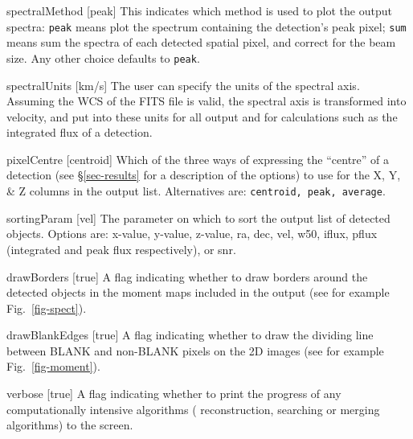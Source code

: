 \begin{Lentry}
\item[{spectralMethod [peak]}] This indicates which method is used
  to plot the output spectra: \texttt{peak} means plot the spectrum
  containing the detection's peak pixel; \texttt{sum} means sum the
  spectra of each detected spatial pixel, and correct for the beam
  size. Any other choice defaults to \texttt{peak}.
\item[{spectralUnits [km/s]}] The user can specify the units of
  the spectral axis. Assuming the WCS of the FITS file is valid, the
  spectral axis is transformed into velocity, and put into these units
  for all output and for calculations such as the integrated flux of a
  detection.
\item[{pixelCentre [centroid]}] Which of the three ways of
  expressing the ``centre'' of a detection (see \S\ref{sec-results}
  for a description of the options) to use for the X, Y, \& Z
  columns in the output list. Alternatives are: \texttt{centroid, peak,
  average}.
\item[{sortingParam [vel]}] The parameter on which to sort the output
  list of detected objects. Options are: x-value, y-value, z-value,
  ra, dec, vel, w50, iflux,  pflux (integrated and peak flux
  respectively), or snr. 
\item[{drawBorders [true]}] A flag indicating whether to draw
  borders around the detected objects in the moment maps included in
  the output (see for example Fig.~\ref{fig-spect}).
\item[{drawBlankEdges [true]}] A flag indicating whether to
  draw the dividing line between BLANK and non-BLANK pixels on the
  2D images (see for example Fig.~\ref{fig-moment}).
\item[{verbose [true]}] A flag indicating whether to print the
  progress of any computationally intensive algorithms (\eg
  reconstruction, searching or merging algorithms) to the screen.
\end{Lentry}

